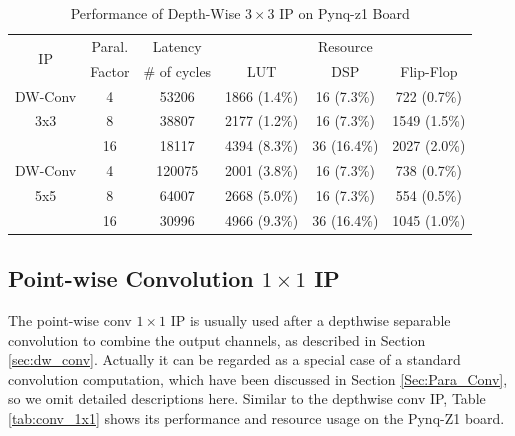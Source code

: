 \documentclass[a4paper, 11pt]{article}
\begin{document}
\begin{table}[]
\centering
\caption{Performance of Depth-Wise $3 \times 3$ IP\vspace{-6pt} on Pynq-z1 Board \cite{r3}} \label{tab:dw_conv}
\renewcommand{\arraystretch}{1.1}
\setlength{\tabcolsep}{4pt}
\begin{tabular}{|c | c | c | c c c| }
\hline 
 \multirow{2}{*}{IP} & Paral. & Latency & \multicolumn{3}{c|}{Resource} \\ \cline{4-6}
 	& Factor  & \# of cycles & LUT & DSP & Flip-Flop  \\
 \hline \hline

DW-Conv & 4 & 53206 &  1866 (1.4\%) & 16 (7.3\%)& 722 (0.7\%)  \\
 3x3  	& 8 & 38807 &  2177 (1.2\%)& 16 (7.3\%) & 1549 (1.5\%) \\
 		& 16 & 18117 &  4394 (8.3\%) & 36 (16.4\%)& 2027 (2.0\%)\\ \hline
 
DW-Conv	  & 4 & 120075 &  2001 (3.8\%) & 16 (7.3\%) & 738 (0.7\%) \\
5x5		  & 8 & 64007 &  2668 (5.0\%) & 16 (7.3\%) & 554 (0.5\%)  \\
 		  & 16 & 30996 &  4966 (9.3\%) & 36 (16.4\%)& 1045 (1.0\%) \\ \hline
 		  
 \hline
\end{tabular}
\end{table}

\subsection{Point-wise Convolution $1 \times 1$ IP \label{sec:pw1x1}}

The point-wise conv $1 \times 1$ IP is usually used after a depthwise separable convolution to combine the output channels, as described in Section \ref{sec:dw_conv}.
Actually it can be regarded as a special case of a standard convolution computation, which have been discussed in Section \ref{Sec:Para_Conv}, 
so we omit detailed descriptions here.
Similar to the depthwise conv IP, Table \ref{tab:conv_1x1}
shows its performance and resource usage on the Pynq-Z1 board.
\end{document}
